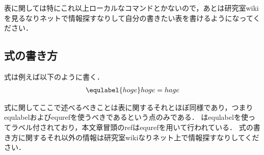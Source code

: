 表に関しては特にこれ以上ローカルなコマンドとかないので，あとは研究室wikiを見るなりネットで情報探すなりして自分の書きたい表を書けるようになってください．


\subsection{式の書き方}
式は例えば以下のように書く．
\begin{eqnarray}
  \equlabel{hoge}
  hoge=hage
\end{eqnarray}

式に関してここで述べるべきことは表に関するそれとほぼ同様であり，つまりequlabelおよびequrefを使うべきであるという点のみである．
はequlabelを使ってラベル付されており，本文章冒頭のrefはequrefを用いて行われている．
式の書き方に関するそれ以外の情報は研究室wikiなりネット上で情報探すなりしてください．
